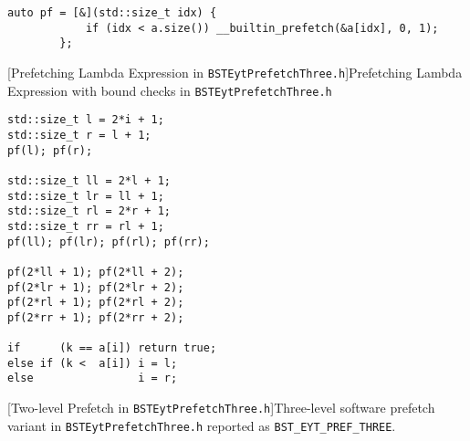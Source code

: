 \documentclass{article}
\begin{document}
\begin{lstlisting}
auto pf = [&](std::size_t idx) {
            if (idx < a.size()) __builtin_prefetch(&a[idx], 0, 1);
        };

\end{lstlisting}
[Prefetching Lambda Expression in \texttt{BSTEytPrefetchThree.h}]{Prefetching Lambda Expression with bound checks in \texttt{BSTEytPrefetchThree.h}}
\label{lst:bsteyt-pref-lambda}
\begin{lstlisting}
std::size_t l = 2*i + 1;
std::size_t r = l + 1;
pf(l); pf(r);

std::size_t ll = 2*l + 1;
std::size_t lr = ll + 1;
std::size_t rl = 2*r + 1;
std::size_t rr = rl + 1;
pf(ll); pf(lr); pf(rl); pf(rr);

pf(2*ll + 1); pf(2*ll + 2);
pf(2*lr + 1); pf(2*lr + 2);
pf(2*rl + 1); pf(2*rl + 2);
pf(2*rr + 1); pf(2*rr + 2);

if      (k == a[i]) return true;
else if (k <  a[i]) i = l;
else                i = r;

\end{lstlisting}
[Two-level Prefetch in \texttt{BSTEytPrefetchThree.h}]{Three-level software
prefetch variant in \texttt{BSTEytPrefetchThree.h} reported as \texttt{BST\_EYT\_PREF\_THREE}.}
\label{lst:bsteyt-pref-three-hs}
\end{document}
